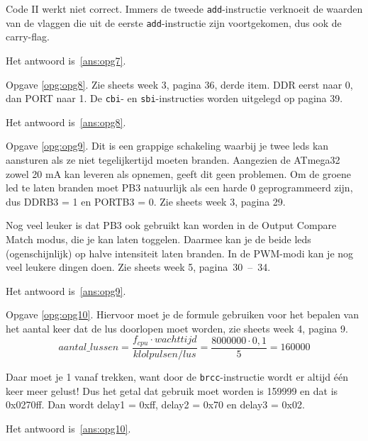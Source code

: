 \documentclass[a4paper,12pt,fleqn,dutch]{tisdexam}
\begin{document}
\begin{questions}
Code II werkt niet correct. Immers de tweede \texttt{add}-instructie verknoeit
de waarden van de vlaggen die uit de eerste \texttt{add}-instructie zijn
voortgekomen, dus ook de carry-flag.

Het antwoord is~\ref{ans:opg7}.

\vspace{1em}
Opgave \ref{opg:opg8}. Zie sheets week 3, pagina 36, derde item. DDR eerst naar 0, dan
PORT naar 1. De \texttt{cbi}- en \texttt{sbi}-instructies worden uitgelegd op
pagina 39.

Het antwoord is~\ref{ans:opg8}.

\vspace{1em}
Opgave \ref{opg:opg9}. Dit is een grappige schakeling waarbij je twee leds kan
aansturen als ze niet tegelijkertijd moeten branden. Aangezien de ATmega32
zowel 20 mA kan leveren als opnemen, geeft dit geen problemen. Om de groene
led te laten branden moet PB3 natuurlijk als een harde 0 geprogrammeerd zijn,
dus DDRB3 = 1 en PORTB3 = 0. Zie sheets week 3, pagina 29.

Nog veel leuker is dat PB3 ook gebruikt kan worden in de Output Compare Match
modus, die je kan laten toggelen. Daarmee kan je de beide leds (ogenschijnlijk)
op halve intensiteit laten branden. In de PWM-modi kan je nog veel leukere
dingen doen. Zie sheets week 5, pagina~30~--~34.

Het antwoord is~\ref{ans:opg9}.

\vspace{1em}
Opgave \ref{opg:opg10}. Hiervoor moet je de formule gebruiken voor het bepalen van het
aantal keer dat de lus doorlopen moet worden, zie sheets week 4, pagina 9.
\begin{equation}
\nonumber aantal\_lussen = \dfrac{f_{cpu} \cdot wachttijd}{klolpulsen/lus}=
                           \dfrac{8000000 \cdot 0,1}{5} = 160000
\end{equation} 

Daar moet je 1 vanaf trekken, want door de \texttt{brcc}-instructie wordt er
altijd \'{e}\'{e}n keer meer gelust! Dus het getal dat gebruik moet worden is
159999 en dat is 0x0270{f}{f}. Dan wordt delay1 = 0x{f}{f}, delay2 = 0x70 en 
delay3 = 0x02.

Het antwoord is~\ref{ans:opg10}.


\end{questions}
\end{document}

